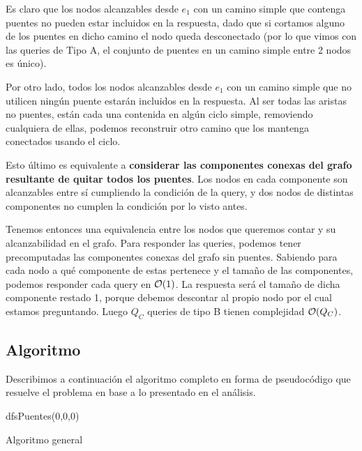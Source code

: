 Es claro que los nodos alcanzables desde $e_1$ con un camino simple que contenga 
puentes no pueden estar incluidos en la respuesta, dado que si cortamos alguno de los puentes en 
dicho camino el nodo queda desconectado (por lo que vimos con las queries de Tipo A, el 
conjunto de puentes en un camino simple entre 2 nodos es único). 

Por otro lado, todos los nodos alcanzables desde $e_1$ con un camino simple que no 
utilicen ningún puente estarán incluidos en la respuesta. 
Al ser todas las aristas no puentes, están cada una contenida en 
algún ciclo simple, removiendo cualquiera de ellas, podemos reconstruir otro camino que 
los mantenga conectados usando el ciclo. 

Esto último es equivalente a \textbf{considerar las componentes conexas del grafo resultante 
de quitar todos los puentes}. Los nodos en cada componente son alcanzables entre sí 
cumpliendo la condición de la query, y dos nodos de distintas componentes no cumplen 
la condición por lo visto antes. 

Tenemos entonces una equivalencia entre los nodos que queremos contar y su alcanzabilidad 
en el grafo. Para responder las queries, podemos tener precomputadas las componentes conexas 
del grafo sin puentes. Sabiendo para cada nodo a qué componente de estas pertenece y el tamaño 
de las componentes, podemos responder cada query en $\mathcal{O}(1)$. La respuesta será el tamaño 
de dicha componente restado 1, porque debemos descontar al propio nodo por el cual estamos preguntando. 
Luego $Q_C$ queries de tipo B tienen complejidad $\mathcal{O}(Q_C)$. \\

\subsection{Algoritmo}
Describimos a continuación el algoritmo completo en forma de pseudocódigo 
que resuelve el problema en base a lo presentado en el análisis. 

\begin{algorithm}[H]
dfsPuentes(0,0,0)\;
\caption{Algoritmo general}
\end{algorithm}

